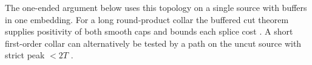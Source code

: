 The one-ended argument below uses this topology on a single source
with buffers in one embedding. For a long round-product collar the
buffered cut theorem supplies positivity of both smooth caps and
bounds each splice cost \cite[One buffered cut]{Baker2026MarkedNecks}.
A short first-order collar can alternatively be tested by a path on
the uncut source with strict peak \(<2T\)
\cite[Short spherical cuts and local minimization]{Baker2026FixedDescent}.
